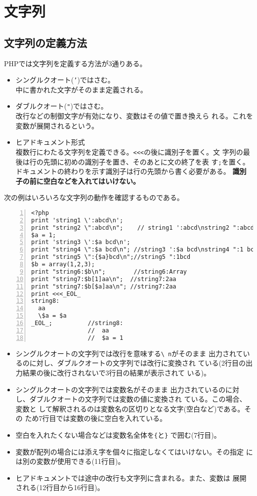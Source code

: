 \section{文字列}
\subsection{文字列の定義方法}PHPでは文字列を定義する方法が3通りある。
\begin{itemize}
 \item シングルクオート(\texttt{'})ではさむ。\\
   中に書かれた文字がそのまま定義される。
 \item ダブルクオート(\Verb+"+)ではさむ。%
       \\改行などの制御文字が有効になり、変数はその値で置き換えら
       れる。これを変数が展開されるという。
 \item ヒアドキュメント形式\\
   複数行にわたる文字列を定義できる。\texttt{<<<}の後に識別子を置く。文
       字列の最後は行の先頭に初めの識別子を置き、そのあとに文の終了を表
       す\texttt{;}を置く。ドキュメントの終わりを示す識別子は行の先頭から書く必要がある。
       {\bfseries 識別子の前に空白などを入れてはいけない。}
\end{itemize}
\begin{Exec}\upshape
次の例はいろいろな文字列の動作を確認するものである。
\begin{Verbatim}[numbers=left]
<?php
print 'string1 \':abcd\n';
print "string2 \":abcd\n";    // string1 ':abcd\nstring2 ":abcd
$a = 1;
print 'string3 \':$a bcd\n';
print "string4 \":$a bcd\n"; //string3 ':$a bcd\nstring4 ":1 bcd
print "string5 \":{$a}bcd\n";//string5 ":1bcd
$b = array(1,2,3);
print "string6:$b\n";        //string6:Array
print "string7:$b[1]aa\n";  //string7:2aa
print "string7:$b[$a]aa\n"; //string7:2aa
print <<<_EOL_
string8:
  aa
  \$a = $a
_EOL_;          //string8:
                //  aa
                //  $a = 1
\end{Verbatim}
\begin{itemize}
 \item シングルクオートの文字列では改行を意味する\texttt{\textbackslash
       n}がそのまま
       出力されているのに対し、ダブルクオートの文字列では改行に変換され
       ている(2行目の出力結果の後に改行されないで3行目の結果が表示されて
       いる)。
 \item シングルクオートの文字列では変数名がそのまま
       出力されているのに対し、ダブルクオートの文字列では変数の値に変換され
       ている。この場合、変数と
       して解釈されるのは変数名の区切りとなる文字(空白など)である。その
       ため7行目では変数の後に空白を入れている。
 \item 空白を入れたくない場合などは変数名全体を\texttt{\{}と\texttt{\}}
       で囲む(7行目)。
 \item 変数が配列の場合には添え字を個々に指定しなくてはいけない。その指定
       には別の変数が使用できる(11行目)。
 \item ヒアドキュメントでは途中の改行も文字列に含まれる。また、変数は
       展開される(12行目から16行目)。
\end{itemize}
\end{Exec}
